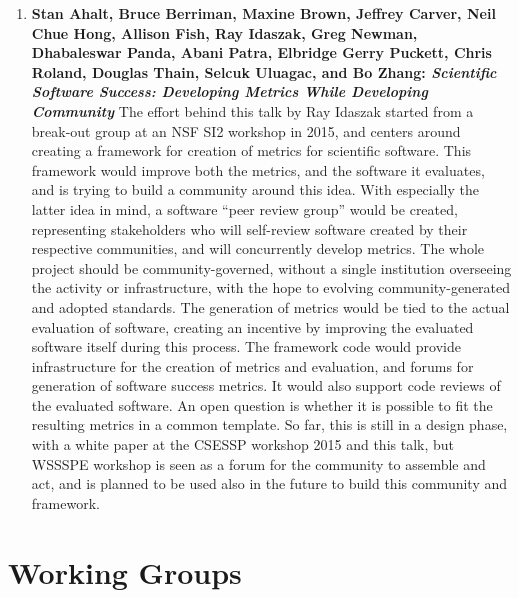 \documentclass[11pt, oneside]{amsart}
\newcommand{\todo}[1]{{\color{blue}$\blacksquare$~\textsf{[TODO: #1]}}}
\begin{document}
\begin{enumerate}
\item \textbf{Stan Ahalt, Bruce Berriman, Maxine Brown, Jeffrey Carver, Neil
Chue Hong, Allison Fish, Ray Idaszak, Greg Newman, Dhabaleswar Panda, Abani
Patra, Elbridge Gerry Puckett, Chris Roland, Douglas Thain, Selcuk Uluagac, and
Bo Zhang: \textit{Scientific Software Success: Developing Metrics While
Developing Community}} The effort behind this talk by Ray Idaszak started from a
break-out group at an NSF SI2 workshop in 2015, and centers around creating a
framework for creation of metrics for scientific software. This framework would
improve both the metrics, and the software it evaluates, and is trying to build
a community around this idea. With especially the latter idea in mind, a
software ``peer review group'' would be created, representing stakeholders who
will self-review software created by their respective communities, and will
concurrently develop metrics. The whole project should be community-governed,
without a single institution overseeing the activity or infrastructure, with the
hope to evolving community-generated and adopted standards. The generation of
metrics would be tied to the actual evaluation of software, creating an
incentive by improving the evaluated software itself during this process. The
framework code would provide infrastructure for the creation of metrics and
evaluation, and forums for generation of software success metrics. It would also
support code reviews of the evaluated software. An open question is whether it
is possible to fit the resulting metrics in a common template. So far, this is
still in a design phase, with a white paper at the CSESSP workshop 2015 and this
talk, but WSSSPE workshop is seen as a forum for the community to assemble and
act, and is planned to be used also in the future to build this community and
framework.

\end{enumerate}

\section{Working Groups} \label{sec:WGs}




%








\end{document}

